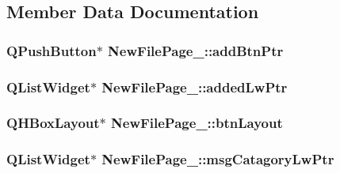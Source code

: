\subsection{Member Data Documentation}
\hypertarget{class_new_file_page__3_ab08b4cb0255ee702eba9e6b1b160ec8d}{
\subsubsection[{add\-Btn\-Ptr}]{\setlength{\rightskip}{0pt plus 5cm}Q\-Push\-Button$\ast$ New\-File\-Page\-\_\-::add\-Btn\-Ptr\hspace{0.3cm}{\ttfamily [private]}}}\label{class_new_file_page__3_ab08b4cb0255ee702eba9e6b1b160ec8d}
\hypertarget{class_new_file_page__3_a5e3ba4d0dd73ecc3c5a37f4bd2420e04}{
\subsubsection[{added\-Lw\-Ptr}]{\setlength{\rightskip}{0pt plus 5cm}Q\-List\-Widget$\ast$ New\-File\-Page\-\_\-::added\-Lw\-Ptr\hspace{0.3cm}{\ttfamily [private]}}}\label{class_new_file_page__3_a5e3ba4d0dd73ecc3c5a37f4bd2420e04}
\hypertarget{class_new_file_page__3_a5688f5927a3dc316a929bfe63cf78d1f}{
\subsubsection[{btn\-Layout}]{\setlength{\rightskip}{0pt plus 5cm}Q\-H\-Box\-Layout$\ast$ New\-File\-Page\-\_\-::btn\-Layout\hspace{0.3cm}{\ttfamily [private]}}}\label{class_new_file_page__3_a5688f5927a3dc316a929bfe63cf78d1f}
\hypertarget{class_new_file_page__3_ae9367af4aff708fc95ed9c4a17367523}{
\subsubsection[{msg\-Catagory\-Lw\-Ptr}]{\setlength{\rightskip}{0pt plus 5cm}Q\-List\-Widget$\ast$ New\-File\-Page\-\_\-::msg\-Catagory\-Lw\-Ptr\hspace{0.3cm}{\ttfamily [private]}}}\label{class_new_file_page__3_ae9367af4aff708fc95ed9c4a17367523}

